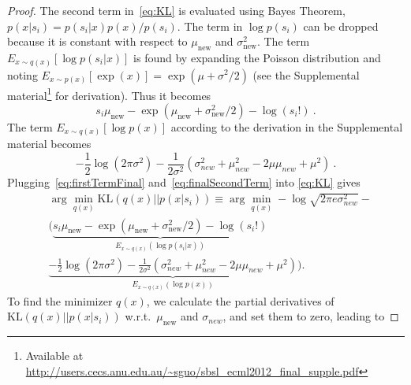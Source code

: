 \begin{proof}
The second term in~\eqref{eq:KL} is evaluated using
Bayes Theorem,
$p(x|s_i)=p(s_i|x)p(x)/p(s_i)$.
The term in $\log p(s_i)$ can be dropped because it is constant
with respect to $\mu_{\text{new}}$ and $\sigma_{\text{new}}^2$.
The term $E_{x\sim q(x)} [\log p(s_i|x)]$ is found by expanding the
Poisson distribution and noting $E_{x\sim p(x)}[\exp(x)] = \exp(\mu+\sigma^2/2)$ (see the Supplemental material\footnote{Available at \url{http://users.cecs.anu.edu.au/~sguo/sbsl_ecml2012_final_supple.pdf}} for derivation).
Thus it becomes
\begin{equation}\label{eq:firstTermFinal}
  s_i \mu_{\text{new}} - \exp(\mu_{\text{new}} + \sigma_{\text{new}}^2/2) - \log(s_i!)~.
\end{equation}
\noindent
The term $E_{x\sim q(x)}[\log p(x)]$
according to the derivation in the Supplemental material
becomes
\begin{equation}\label{eq:finalSecondTerm}
     -\frac{1}{2}\log(2\pi\sigma^2) -
         \frac{1}{2\sigma^2}\left(\sigma_{new}^2 + \mu_{new}^2-2\mu\mu_{new} + \mu^2 \right)~.
\end{equation}
Plugging~\eqref{eq:firstTermFinal} and~\eqref{eq:finalSecondTerm} into
\eqref{eq:KL} gives
\begin{align*}
    &\arg\min_{q(x)}\text{KL}\left(q(x)|| p(x|s_i)\right) \equiv \arg\min_{q(x)}-\log\sqrt{2\pi e \sigma_{new}^2} - \nonumber \\
    &\bigg( \underbrace{s_i \mu_{\text{new}} - \exp(\mu_{\text{new}} + \sigma_{\text{new}}^2/2) - \log(s_i!)}_{E_{x\sim q(x)} (\log p(s_i|x))} \nonumber \\
    & \underbrace{-\frac{1}{2}\log(2\pi\sigma^2) - \frac{1}{2\sigma^2}\left(\sigma_{new}^2 + \mu_{new}^2-2\mu\mu_{new} + \mu^2 \right)}_{E_{x\sim q(x)}(\log p(x))} \bigg).
\end{align*}
To find the minimizer $q(x)$, we calculate the partial derivatives of
$\text{KL}\left(q(x)|| p(x|s_i)\right)$ w.r.t.\
$\mu_{\text{new}}$ and $\sigma_{new}$, and set them to zero, leading to%

\end{proof}
